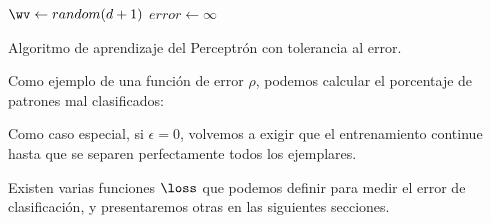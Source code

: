 \begin{algorithm}[H]
$\wv \leftarrow random(d+1)$\;
$error \leftarrow \infty$\;
\caption{Algoritmo de aprendizaje del Perceptrón con tolerancia al error.} 
\end{algorithm}

Como ejemplo de una función de error $\rho$, podemos calcular el porcentaje de patrones mal clasificados:


Como caso especial, si $\epsilon=0$, volvemos a exigir que el entrenamiento continue hasta que se separen perfectamente todos los ejemplares.

Existen varias funciones $\loss$ que podemos definir para medir el error de clasificación, y presentaremos otras en las siguientes secciones. 
